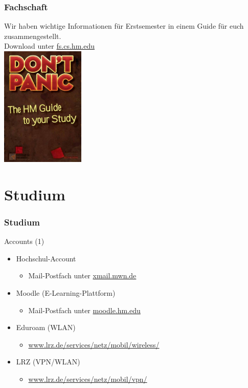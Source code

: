 \documentclass{beamer}
\begin{document}
	\begin{frame}
		\frametitle{Fachschaft}
		Wir haben wichtige Informationen für Erstsemester in einem Guide für euch zusammengestellt.\\
		\bigskip
		Download unter \url{fs.cs.hm.edu}\\
		\center
		\includegraphics[width=0.3\textwidth]{erstiguide.jpg}
	\end{frame}
	
	\section{Studium}
	
	\begin{frame}
		\frametitle{Studium}
		Accounts (1)
		\begin{itemize}
			\item Hochschul-Account
			\begin{itemize}
				\item Mail-Postfach unter \url{xmail.mwn.de}
			\end{itemize}
			\pause
			\item Moodle (E-Learning-Plattform)
			\begin{itemize}
				\item Mail-Postfach unter \url{moodle.hm.edu}
			\end{itemize}
			\pause
			\item Eduroam (WLAN)
			\begin{itemize}
				\item \url{www.lrz.de/services/netz/mobil/wireless/}
			\end{itemize}
			\pause
			\item LRZ (VPN/WLAN)
			\begin{itemize}
				\item \url{www.lrz.de/services/netz/mobil/vpn/}
			\end{itemize}
		\end{itemize}
	\end{frame}
	
\end{document}
